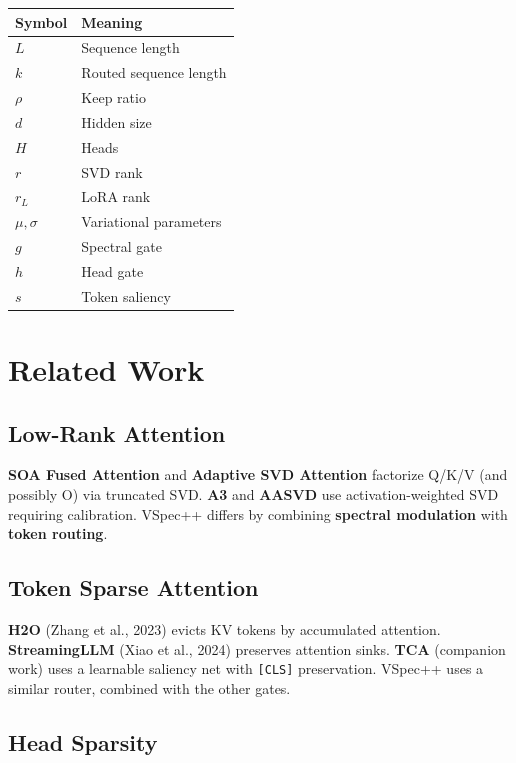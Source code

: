 \begin{table}[H]
\centering
\small
\begin{tabular}{ll}
\toprule
\textbf{Symbol} & \textbf{Meaning} \\
\midrule
$L$ & Sequence length \\
$k$ & Routed sequence length \\
$\rho$ & Keep ratio \\
$d$ & Hidden size \\
$H$ & Heads \\
$r$ & SVD rank \\
$r_L$ & LoRA rank \\
$\mu, \sigma$ & Variational parameters \\
$g$ & Spectral gate \\
$h$ & Head gate \\
$s$ & Token saliency \\
\bottomrule
\end{tabular}
\end{table}



\section{Related Work}

\subsection{Low-Rank Attention}

\textbf{SOA Fused Attention} and \textbf{Adaptive SVD Attention} factorize Q/K/V 
(and possibly O) via truncated SVD. \textbf{A3} and \textbf{AASVD} use 
activation-weighted SVD requiring calibration. VSpec++ differs by 
combining \textbf{spectral modulation} with \textbf{token routing}.

\subsection{Token Sparse Attention}

\textbf{H2O} (Zhang et al., 2023) evicts KV tokens by accumulated attention. 
\textbf{StreamingLLM} (Xiao et al., 2024) preserves attention sinks. \textbf{TCA} 
(companion work) uses a learnable saliency net with \texttt{[CLS]} preservation. 
VSpec++ uses a similar router, combined with the other gates.

\subsection{Head Sparsity}

